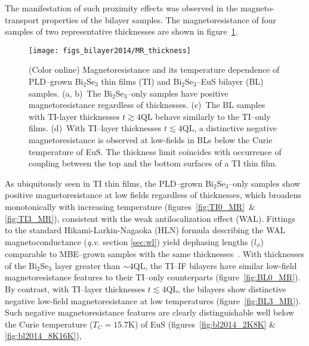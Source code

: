 The manifestation of such proximity effects was observed in the magneto-transport properties of the bilayer samples. The magnetoresistance of four samples of two representative thicknesses are shown in figure~\ref{fig:bl2014_MR_thickness}.%
%
\begin{figure}[ht]%
\centering%
\subfloat{\label{fig:TI0_MR}}%
\subfloat{\label{fig:TI3_MR}}%
\subfloat{\label{fig:BL0_MR}}%
\subfloat{\label{fig:BL3_MR}}%
\texttt{[image: figs\_bilayer2014/MR\_thickness]}%
\caption[Magnetoresistance of Bi$_2$Se$_3$ thin films and Bi$_2$Se$_3$--EuS bilayers]{\label{fig:bl2014_MR_thickness}(Color online) Magnetoresistance and its temperature dependence of PLD--grown Bi$_2$Se$_3$ thin films (TI) and Bi$_2$Se$_3$--EuS bilayer (BL) samples. (a, b)~The Bi$_2$Se$_3$--only samples have positive magnetoresistance regardless of thicknesses. (c)~The BL samples with TI-layer thicknesses $t\gtrsim4\mathrm{QL}$ behave similarly to the TI--only films. (d)~With TI--layer thicknesses $t\lesssim4\mathrm{QL}$, a distinctive negative magnetoresistance is observed at low-fields in BLs below the Curie temperature of EuS. The thickness limit coincides with occurrence of coupling between the top and the bottom surfaces of a TI thin film.}%
\end{figure} %
%
As ubiquitously seen in TI thin films, the PLD--grown Bi$_2$Se$_3$--only samples show positive magnetoresistance at low fields regardless of thicknesses, which broadens monotonically with increasing temperature (figures~\ref{fig:TI0_MR}~\& \ref{fig:TI3_MR}), consistent with the weak antilocalization effect (WAL). Fittings to the standard Hikami-Larkin-Nagaoka (HLN) formula describing the WAL magnetoconductance (\textit{q.v.} section \ref{sec:wl}) yield dephasing lengths ($l_\phi$) comparable to MBE--grown samples with the same thicknesses~\cite{TI_WAL_thickness, zhangli2013}. With thicknesses of the Bi$_2$Se$_3$ layer greater than $\sim4\mathrm{QL}$, the TI--IF bilayers have similar low-field magnetoresistance features to their TI--only counterparts (figure~\ref{fig:BL0_MR}). By contrast, with TI--layer thicknesses $t\lesssim4\mathrm{QL}$, the bilayers show distinctive negative low-field magnetoresistance at low temperatures (figure~\ref{fig:BL3_MR}). Such negative magnetoresistance features are clearly distinguishable well below the Curie temperature ($T_C=15.7$K) of EuS (figures~\ref{fig:bl2014_2K8K} \& \ref{fig:bl2014_8K16K}), %
%
%
